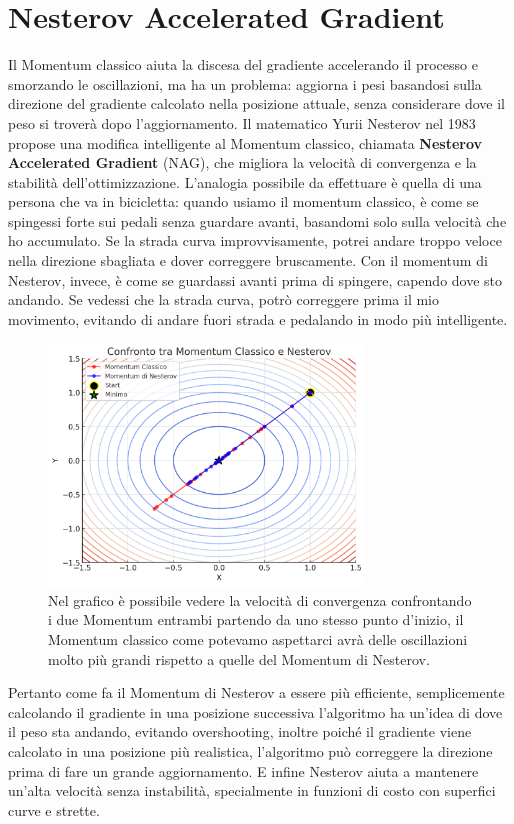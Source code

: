 \section{Nesterov Accelerated Gradient}
Il Momentum classico aiuta la discesa del gradiente accelerando il processo e smorzando le oscillazioni, ma ha un problema: aggiorna i pesi basandosi sulla direzione del gradiente calcolato nella posizione attuale, senza considerare dove il peso si troverà dopo l'aggiornamento. Il matematico Yurii Nesterov nel 1983 propose una modifica intelligente al Momentum classico, chiamata \textbf{Nesterov Accelerated Gradient} (NAG), che migliora la velocità di convergenza e la stabilità dell’ottimizzazione. L'analogia possibile da effettuare è quella di una persona che va in bicicletta: quando usiamo il momentum classico, è come se spingessi forte sui pedali senza guardare avanti, basandomi solo sulla velocità che ho accumulato. Se la strada curva improvvisamente, potrei andare troppo veloce nella direzione sbagliata e dover correggere bruscamente. Con il momentum di Nesterov, invece, è come se guardassi avanti prima di spingere, capendo dove sto andando. Se vedessi che la strada curva, potrò correggere prima il mio movimento, evitando di andare fuori strada e pedalando in modo più intelligente.
\begin{figure}
    \centering
    \includegraphics[width=0.75\textwidth]{figure/momenest.png}
    \caption{Nel grafico è possibile vedere la velocità di convergenza confrontando i due Momentum entrambi partendo da uno stesso punto d'inizio, il Momentum classico come potevamo aspettarci avrà delle oscillazioni molto più grandi rispetto a quelle del Momentum di Nesterov.}
    \label{fig:MomentumVS}
\end{figure}
Pertanto come fa il Momentum di Nesterov a essere più efficiente, semplicemente calcolando il gradiente in una posizione successiva l'algoritmo ha un'idea di dove il peso sta andando, evitando overshooting, inoltre poiché il gradiente viene calcolato in una posizione più realistica, l'algoritmo può correggere la direzione prima di fare un grande aggiornamento. E infine Nesterov aiuta a mantenere un'alta velocità senza instabilità, specialmente in funzioni di costo con superfici curve e strette.

